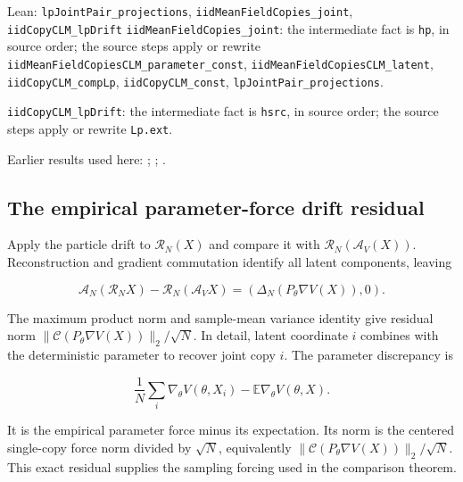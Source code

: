\documentclass[11pt,a4paper]{report}
\begin{document}
\begin{leanbox}{Lean: \texttt{lpJointPair\_\allowbreak{}projections}, \texttt{iidMeanFieldCopies\_\allowbreak{}joint}, \texttt{iidCopyCLM\_\allowbreak{}lpDrift}}
\texttt{iid\allowbreak{}Mean\allowbreak{}Field\allowbreak{}Copies\_\allowbreak{}joint}: the intermediate fact is \texttt{hp}, in source order; the source steps apply or rewrite \texttt{iid\allowbreak{}Mean\allowbreak{}Field\allowbreak{}Copies\allowbreak{}CLM\_\allowbreak{}parameter\_\allowbreak{}const}, \texttt{iid\allowbreak{}Mean\allowbreak{}Field\allowbreak{}Copies\allowbreak{}CLM\_\allowbreak{}latent}, \texttt{iid\allowbreak{}Copy\allowbreak{}CLM\_\allowbreak{}comp\allowbreak{}Lp}, \texttt{iid\allowbreak{}Copy\allowbreak{}CLM\_\allowbreak{}const}, \texttt{lp\allowbreak{}Joint\allowbreak{}Pair\_\allowbreak{}projections}.



\texttt{iid\allowbreak{}Copy\allowbreak{}CLM\_\allowbreak{}lp\allowbreak{}Drift}: the intermediate fact is \texttt{hsrc}, in source order; the source steps apply or rewrite \texttt{Lp.\allowbreak{}ext}.
\end{leanbox}


Earlier results used here: \cite[Section~3.13.2]{LangevinLean2026ULASC}; \cite[Section~3.13.3]{LangevinLean2026ULASC}; \cite[Section~3.1.1]{LangevinLean2026IPLA}.
\subsection{\texorpdfstring{The empirical parameter-force drift residual}{The empirical parameter-force drift residual}}
\label{report-step-ProximalLangevin-MeanFieldCopies-lean-5}


Apply the particle drift to \(\mathcal R_N(X)\) and compare it with \(\mathcal R_N(\mathcal A_V(X))\). Reconstruction and gradient commutation identify all latent components, leaving

\[\mathcal A_N(\mathcal R_NX)-\mathcal R_N(\mathcal A_VX)=\left(\Delta_N(P_\theta\nabla V(X)),0\right).\]

The maximum product norm and sample-mean variance identity give residual norm \(\|\mathcal C(P_\theta\nabla V(X))\|_2/\sqrt N\). In detail, latent coordinate \(i\) combines with the deterministic parameter to recover joint copy \(i\). The parameter discrepancy is

\[\frac1N\sum_i\nabla_\theta V(\theta,X_i)-\mathbb E\nabla_\theta V(\theta,X).\]

It is the empirical parameter force minus its expectation. Its norm is the centered single-copy force norm divided by \(\sqrt N\), equivalently \(\|\mathcal C(P_\theta\nabla V(X))\|_2/\sqrt N\). This exact residual supplies the sampling forcing used in the comparison theorem.
\end{document}
